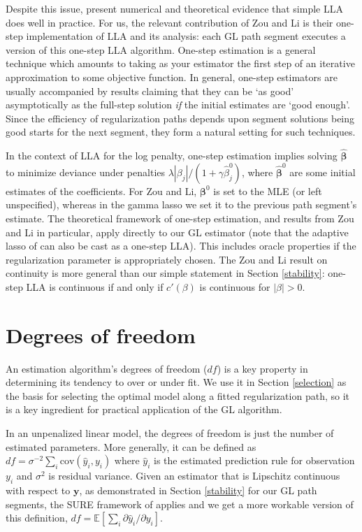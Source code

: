 \documentclass[12pt]{article}
\newcommand{\bs}[1]{\boldsymbol{#1}}
\newcommand{\mr}[1]{\mathrm{#1}}
\newcommand{\bm}[1]{\mathbf{#1}}
\newcommand{\ds}[1]{\mathds{#1}}
\begin{document}
Despite this issue, \citet{zou_one-step_2008} present numerical and
theoretical evidence that simple LLA does well in practice. For us, the
relevant contribution of Zou and Li is their one-step implementation of LLA
and its analysis: each GL path segment executes a version of this one-step LLA
algorithm. One-step estimation is a general technique
\citep[e.g.,][]{bickel_one-step_1975} which amounts to taking as your estimator
the first step of an iterative approximation to some objective function.   In
general, one-step estimators are usually accompanied by results claiming that
they can be `as good' asymptotically as the full-step solution {\it if} the
initial estimates are `good enough'.  Since the efficiency of regularization
paths depends upon segment solutions being good starts for the next segment,
they form a natural setting for such techniques.

In the context of LLA for the log penalty, one-step estimation implies solving
$\bs{\hat\beta}$ to minimize deviance under  penalties $\lambda|\beta_j|/(1 +
\gamma \hat\beta_j^0)$, where $\bs{\hat\beta}^0$ are some initial estimates of
the coefficients.  For Zou and Li, $\bs{\beta}^0$ is set to the
MLE (or left unspecified), whereas in  the gamma lasso we set it to the
previous path segment's estimate. The theoretical framework of one-step
estimation, and results from  Zou and Li in particular, apply
directly to our GL estimator (note that the adaptive lasso of
\citet{zou_adaptive_2006} can also be cast as a one-step LLA). This includes
oracle properties if the regularization parameter is appropriately chosen. The
Zou and Li result on continuity is  more general than our
simple statement in Section \ref{stability}:  one-step LLA is continuous if
and only if $c'(\beta)$ is continuous for $|\beta|>0$.  

\section{Degrees of freedom}
\label{dof}

An estimation algorithm's degrees of freedom ($df$) is a key property in
determining its tendency to over or under fit.  We use it in Section
\ref{selection} as the  basis for selecting the optimal model along a
fitted regularization path, so it is a key ingredient for practical
application of the GL algorithm.  

In an unpenalized linear model, the degrees of freedom is just the number of
estimated parameters.  More generally, it can be defined as
\citep[e.g.][]{efron_least_2004} $df = \sigma^{-2} \sum_i \mr{cov}(\hat y_i,
y_i)$ where $\hat y_i$ is the estimated prediction rule for observation $y_i$
and $\sigma^2$ is residual variance. Given an estimator that is Lipschitz
continuous with respect to $\bm{y}$, as demonstrated in Section
\ref{stability} \citep[or in ][]{zou_one-step_2008} for our GL path segments,
the SURE framework of \cite{stein_estimation_1981} applies and we get a more
workable version of this definition,  $df = \ds{E}\left[\sum_i \partial \hat
y_i/\partial y_i\right]$.
\end{document}
